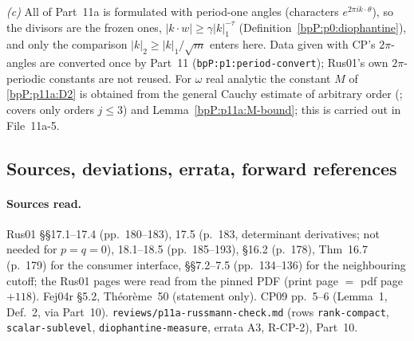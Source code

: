 \begin{remark}
\emph{(c)} All of Part~11a is formulated with period-one angles (characters $e^{2\pi ik\cdot\theta}$), so the divisors are the frozen ones, $\lvert k\cdot w\rvert\ge\gamma\lvert k\rvert_1^{-\tau}$ (Definition~\ref{bpP:p0:diophantine}), and only the comparison $\lvert k\rvert_2\ge\lvert k\rvert_1/\sqrt m$ enters here. Data given with CP's $2\pi$-angles are converted once by Part~11 (\texttt{bpP:p1:period-convert}); Rus01's own $2\pi$-periodic constants are not reused. For $\omega$ real analytic the constant $M$ of \ref{bpP:p11a:D2} is obtained from the general Cauchy estimate of arbitrary order (;  covers only orders $j\le3$) and Lemma~\ref{bpP:p11a:M-bound}; this is carried out in File~11a-5.
\end{remark}

\subsection{Sources, deviations, errata, forward references}\label{bpP:p11a:notes}

\paragraph{Sources read.} Rus01 \S\S17.1--17.4 (pp.~180--183), 17.5 (p.~183, determinant derivatives; not needed for $p=q=0$), 18.1--18.5 (pp.~185--193), \S16.2 (p.~178), Thm~16.7 (p.~179) for the consumer interface, \S\S7.2--7.5 (pp.~134--136) for the neighbouring cutoff; the Rus01 pages were read from the pinned PDF (print page $=$ pdf page $+118$). Fej04r \S5.2, Th\'eor\`eme~50 (statement only). CP09 pp.~5--6 (Lemma~1, Def.~2, via Part~10). \texttt{reviews/p11a-russmann-check.md} (rows \texttt{rank-compact}, \texttt{scalar-sublevel}, \texttt{diophantine-measure}, errata A3, R-CP-2), Part~10.

